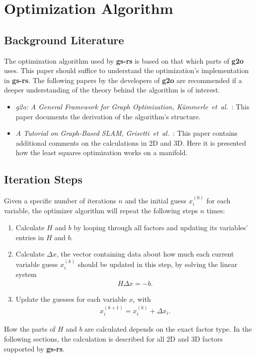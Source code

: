 \section{Optimization Algorithm}

\subsection{Background Literature}

The optimization algorithm used by \textbf{gs-rs} is based on that which parts of \textbf{g2o} uses. This paper should suffice to understand the optimization's implementation in \textbf{gs-rs}. The following papers by the developers of \textbf{g2o} are recommended if a deeper understanding of the theory behind the algorithm is of interest.

\begin{itemize}
	\item \textit{g2o: A General Framework for Graph Optimization, Kümmerle~et~al.}~\cite{kummerle2011g2o}: This paper documents the derivation of the algorithm's structure.
	\item \textit{A Tutorial on Graph-Based SLAM, Grisetti~et~al.}~\cite{grisetti2010tutorial}: This paper contains additional comments on the calculations in 2D and 3D. Here it is presented how the least squares optimization works on a manifold.
\end{itemize}

\subsection{Iteration Steps}

Given a specific number of iterations $n$ and the initial guess $x_i^{(0)}$ for each variable, the optimizer algorithm will repeat the following steps $n$ times:

\begin{enumerate}
	\item Calculate $H$ and $b$ by looping through all factors and updating its variables' entries in $H$ and $b$.
	\item Calculate $\Delta x$, the vector containing data about how much each current variable guess $x_i^{(k)}$ should be updated in this step, by solving the linear system
		\begin{align}
			H \Delta x = -b.
		\end{align}
	\item Update the guesses for each variable $x_i$ with
		\begin{align}
			x_i^{(k+1)} = x_i^{(k)} + \Delta x_i.
		\end{align}
\end{enumerate}

How the parts of $H$ and $b$ are calculated depends on the exact factor type. In the following sections, the calculation is described for all 2D and 3D factors supported by \textbf{gs-rs}.
